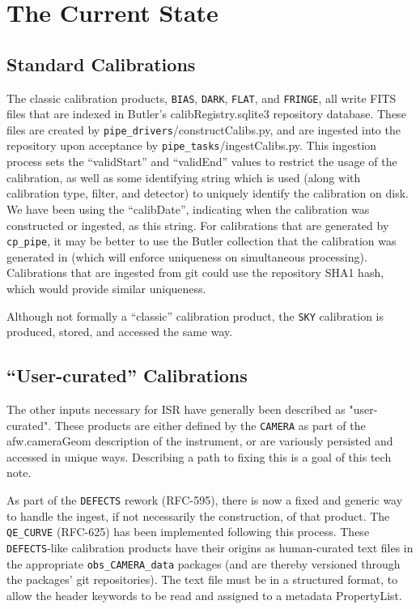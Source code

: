 \documentclass[DM,authoryear,toc]{lsstdoc}
\begin{document}
\section{The Current State}

\subsection{Standard Calibrations}


The classic calibration products, \verb|BIAS|, \verb|DARK|,
\verb|FLAT|, and \verb|FRINGE|, all write FITS files that are indexed
in Butler's calibRegistry.sqlite3 repository database.  These files
are created by \verb|pipe_drivers|/constructCalibs.py, and are
ingested into the repository upon acceptance by
\verb|pipe_tasks|/ingestCalibs.py.  This ingestion process sets the
``validStart'' and ``validEnd'' values to restrict the usage of the
calibration, as well as some identifying string which is used (along
with calibration type, filter, and detector) to uniquely identify the
calibration on disk.  We have been using the ``calibDate'', indicating
when the calibration was constructed or ingested, as this string.  For
calibrations that are generated by \verb|cp_pipe|, it may be better to
use the Butler collection that the calibration was generated in (which
will enforce uniqueness on simultaneous processing).  Calibrations
that are ingested from git could use the repository SHA1 hash, which
would provide similar uniqueness.

Although not formally a ``classic'' calibration product, the \verb|SKY|
calibration is produced, stored, and accessed the same way.

\subsection{``User-curated'' Calibrations}

The other inputs necessary for ISR have generally been described as
"user-curated".  These products are either defined by the \verb|CAMERA| as
part of the afw.cameraGeom description of the instrument, or are
variously persisted and accessed in unique ways.  Describing a path to
fixing this is a goal of this tech note.

As part of the \verb|DEFECTS| rework (RFC-595), there is now a fixed and
generic way to handle the ingest, if not necessarily the construction,
of that product.  The \verb|QE_CURVE| (RFC-625) has been implemented
following this process.  These \verb|DEFECTS|-like calibration products have
their origins as human-curated text files in the appropriate
\verb|obs_CAMERA_data| packages (and are thereby versioned through the
packages' git repositories).  The text file must be in a structured
format, to allow the header keywords to be read and assigned to a
metadata PropertyList.
\end{document}
